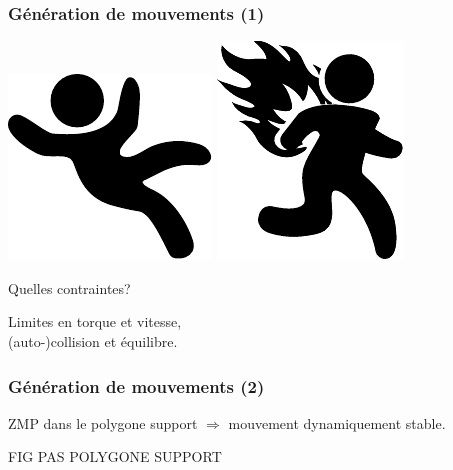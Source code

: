 \documentclass[14pt,utf8x,hyperref={pdfpagelabels=false}]{beamer}
\begin{document}
\begin{slideDecision}
  \frametitle{Génération de mouvements (1)}
  \begin{changeleftmargin}{1.1cm}
  \begin{center}
    \includegraphics[width=.25\paperheight]{src/slides/falling.pdf}%
    \includegraphics[width=.25\paperheight]{src/slides/burning.pdf}\par
    \bigskip
    Quelles contraintes?\par
  \end{center}
  Limites en torque et vitesse,\\
  (auto-)collision et \alert{équilibre}.
  \end{changeleftmargin}
\end{slideDecision}

\begin{slideDecision}
  \frametitle{Génération de mouvements (2)}
  \begin{changeleftmargin}{1.1cm}
    \begin{center}
      ZMP dans le polygone support $\Rightarrow$ mouvement
      dynamiquement stable.

      \bigskip

      FIG PAS POLYGONE SUPPORT
    \end{center}
  \end{changeleftmargin}
\end{slideDecision}
\end{document}
